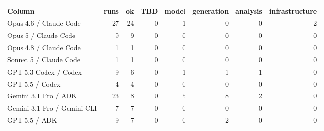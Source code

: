 \begin{tabular}{lrrrrrrr}
\toprule
Column & runs & ok & TBD & model & generation & analysis & infrastructure \\
\midrule
Opus 4.6 / Claude Code & 27 & 24 & 0 & 1 & 0 & 0 & 2 \\
Opus 5 / Claude Code & 9 & 9 & 0 & 0 & 0 & 0 & 0 \\
Opus 4.8 / Claude Code & 1 & 1 & 0 & 0 & 0 & 0 & 0 \\
Sonnet 5 / Claude Code & 1 & 1 & 0 & 0 & 0 & 0 & 0 \\
GPT-5.3-Codex / Codex & 9 & 6 & 0 & 1 & 1 & 1 & 0 \\
GPT-5.5 / Codex & 4 & 4 & 0 & 0 & 0 & 0 & 0 \\
Gemini 3.1 Pro / ADK & 23 & 8 & 0 & 5 & 8 & 2 & 0 \\
Gemini 3.1 Pro / Gemini CLI & 7 & 7 & 0 & 0 & 0 & 0 & 0 \\
GPT-5.5 / ADK & 9 & 7 & 0 & 0 & 2 & 0 & 0 \\
\bottomrule
\end{tabular}

